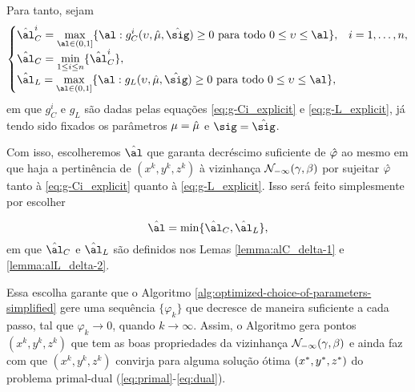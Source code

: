 Para tanto, sejam  
\begin{equation}
	\label{eq:al-C+al-L}
\begin{cases}
	\hat{\al}_{C}^{i} = \displaystyle \max_{\al\in (0,1]} \{ \al : g_{C}^{i}(\upsilon,\nextmu,\nextsig)\geq0 \text{ para todo } 0 \leq \upsilon\leq \al  \}, & i = 1,\ldots,n,\\
	\hat{\al}_{C} = \displaystyle \min_{1\leq i \leq n} \{\hat{\al}_{C}^{i}\}, \\
	\hat{\al}_{L} = \displaystyle \max_{\al\in (0,1]} \{ \al : g_{L}(\upsilon,\nextmu,\nextsig)\geq0 \text{ para todo } 0 \leq  \upsilon\leq \al  \},
\end{cases}
\end{equation}
em que $g_{C}^{i}$ e $g_{L}$ são dadas pelas equações  \eqref{eq:g-Ci_explicit} e \eqref{eq:g-L_explicit}, já tendo sido fixados os parâmetros $\mu=\hat{\mu}$ e $\sig=\nextsig$.


Com isso, escolheremos  $\hat\al$ que garanta decréscimo suficiente de $\hat{\varphi}$ ao mesmo em que haja a pertinência de $({x}^{k} ,{y}^{k},{z}^{k})$ à vizinhança $\mathcal{N}_{-\infty}(\gamma,\beta)$ por sujeitar $\hat{\varphi}$ tanto à  \eqref{eq:g-Ci_explicit} quanto à \eqref{eq:g-L_explicit}. Isso será feito simplesmente por escolher

\begin{equation}
	\label{eq:nex-al}
\nextal = \min\{\nextal_{C},\nextal_{L}\},
\end{equation}
em que $\nextal_{C}$ e $\nextal_{L}$ são definidos nos Lemas \ref{lemma:alC_delta-1} e  \ref{lemma:alL_delta-2}.

  




 Essa escolha garante que  o Algoritmo \ref{alg:optimized-choice-of-parameters-simplified} gere uma sequência $\{\varphi_k\}$ que decresce de maneira suficiente a cada passo, tal que $\varphi_k \to 0$, quando $k\to \infty$. Assim, o Algoritmo gera pontos $({x}^{k} ,{y}^{k},{z}^{k})$ que tem as boas propriedades da vizinhança $\mathcal{N}_{-\infty}(\gamma,\beta)$ e ainda faz com que $({x}^{k} ,{y}^{k},{z}^{k})$ convirja para  alguma solução ótima $(x^* ,y^*,z^*)$ do problema primal-dual  (\ref{eq:primal}-\ref{eq:dual}).




